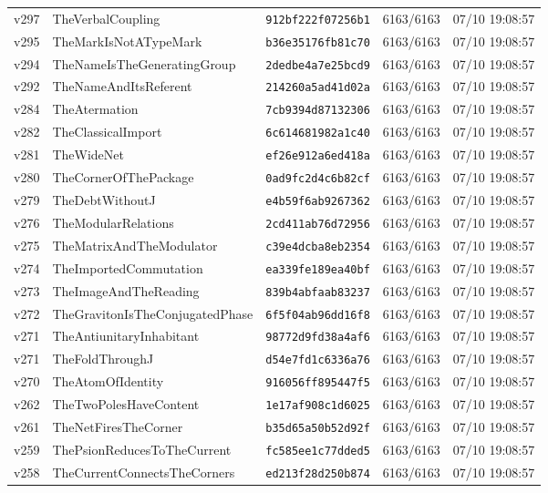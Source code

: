 \documentclass[11pt]{article}
\theoremstyle{definition}\newtheorem{deriv}{Derivation}
\begin{document}
{\begin{longtable}{@{}lllll@{}}
v297 & TheVerbalCoupling & \texttt{912bf222f07256b1} & 6163/6163 & 07/10 19:08:57 \\
v295 & TheMarkIsNotATypeMark & \texttt{b36e35176fb81c70} & 6163/6163 & 07/10 19:08:57 \\
v294 & TheNameIsTheGeneratingGroup & \texttt{2dedbe4a7e25bcd9} & 6163/6163 & 07/10 19:08:57 \\
v292 & TheNameAndItsReferent & \texttt{214260a5ad41d02a} & 6163/6163 & 07/10 19:08:57 \\
v284 & TheAtermation & \texttt{7cb9394d87132306} & 6163/6163 & 07/10 19:08:57 \\
v282 & TheClassicalImport & \texttt{6c614681982a1c40} & 6163/6163 & 07/10 19:08:57 \\
v281 & TheWideNet & \texttt{ef26e912a6ed418a} & 6163/6163 & 07/10 19:08:57 \\
v280 & TheCornerOfThePackage & \texttt{0ad9fc2d4c6b82cf} & 6163/6163 & 07/10 19:08:57 \\
v279 & TheDebtWithoutJ & \texttt{e4b59f6ab9267362} & 6163/6163 & 07/10 19:08:57 \\
v276 & TheModularRelations & \texttt{2cd411ab76d72956} & 6163/6163 & 07/10 19:08:57 \\
v275 & TheMatrixAndTheModulator & \texttt{c39e4dcba8eb2354} & 6163/6163 & 07/10 19:08:57 \\
v274 & TheImportedCommutation & \texttt{ea339fe189ea40bf} & 6163/6163 & 07/10 19:08:57 \\
v273 & TheImageAndTheReading & \texttt{839b4abfaab83237} & 6163/6163 & 07/10 19:08:57 \\
v272 & TheGravitonIsTheConjugatedPhase & \texttt{6f5f04ab96dd16f8} & 6163/6163 & 07/10 19:08:57 \\
v271 & TheAntiunitaryInhabitant & \texttt{98772d9fd38a4af6} & 6163/6163 & 07/10 19:08:57 \\
v271 & TheFoldThroughJ & \texttt{d54e7fd1c6336a76} & 6163/6163 & 07/10 19:08:57 \\
v270 & TheAtomOfIdentity & \texttt{916056ff895447f5} & 6163/6163 & 07/10 19:08:57 \\
v262 & TheTwoPolesHaveContent & \texttt{1e17af908c1d6025} & 6163/6163 & 07/10 19:08:57 \\
v261 & TheNetFiresTheCorner & \texttt{b35d65a50b52d92f} & 6163/6163 & 07/10 19:08:57 \\
v259 & ThePsionReducesToTheCurrent & \texttt{fc585ee1c77dded5} & 6163/6163 & 07/10 19:08:57 \\
v258 & TheCurrentConnectsTheCorners & \texttt{ed213f28d250b874} & 6163/6163 & 07/10 19:08:57 \\

\end{longtable}}
\end{document}
